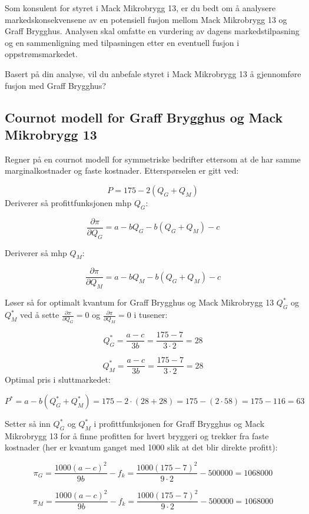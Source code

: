 \documentclass[
  12pt,
  a4paper,
  DIV=11,
  numbers=noendperiod]{scrartcl}
\begin{document}
Som konsulent for styret i Mack Mikrobrygg 13, er du bedt om å analysere
markedskonsekvensene av en potensiell fusjon mellom Mack Mikrobrygg 13
og Graff Brygghus. Analysen skal omfatte en vurdering av dagens
markedstilpasning og en sammenligning med tilpasningen etter en
eventuell fusjon i oppstrømsmarkedet.

Basert på din analyse, vil du anbefale styret i Mack Mikrobrygg 13 å
gjennomføre fusjon med Graff Brygghus?

\clearpage

\subsection{Cournot modell for Graff Brygghus og Mack Mikrobrygg
13}\label{cournot-modell-for-graff-brygghus-og-mack-mikrobrygg-13}

Regner på en cournot modell for symmetriske bedrifter ettersom at de har
samme marginalkostnader og faste kostnader. Etterspørselen er gitt ved:

\[P = 175 − 2(Q_G+Q_M) \tag{37}\] Deriverer så profittfunksjonen mhp
\(Q_G\):

\[\frac{\partial \pi}{\partial Q_G} = a - bQ_G - b(Q_G+Q_M) -c \tag{38}\]

Deriverer så mhp \(Q_M\):

\[\frac{\partial \pi}{\partial Q_M} = a - bQ_M - b(Q_G+Q_M) -c \tag{39}\]

Løser så for optimalt kvantum for Graff Brygghus og Mack Mikrobrygg 13
\(Q_G^*\) og \(Q_M^*\) ved å sette
\(\frac{\partial \pi}{\partial Q_G} = 0\) og
\(\frac{\partial \pi}{\partial Q_M} = 0\) i tusener:

\[Q_G^* = \frac{a - c}{3b} = \frac{175 - 7}{3 \cdot 2} = 28 \tag{40}\]

\[Q_M^* = \frac{a - c}{3b} = \frac{175 - 7}{3 \cdot 2} = 28 \tag{41}\]
Optimal pris i sluttmarkedet:

\[P^* = a - b(Q_G^*+Q_M^*) = 175 - 2 \cdot (28+28) = 175 - (2 \cdot 58)  = 175 - 116 = 63 \tag{42}\]

Setter så inn \(Q_G^*\) og \(Q_M^*\) i profittfunksjonen for Graff
Brygghus og Mack Mikrobrygg 13 for å finne profitten for hvert bryggeri
og trekker fra faste kostnader (her er kvantum ganget med 1000 slik at
det blir direkte profitt):

\[ \pi_G = \frac{1000(a-c)^2}{9b} -f_k = \frac{1000(175-7)^2}{9 \cdot 2} -500000 = 1068000 \tag{43}\]

\[ \pi_M = \frac{1000(a-c)^2}{9b} -f_k = \frac{1000(175-7)^2}{9 \cdot 2} -500000 = 1068000 \tag{44}\]
\end{document}
